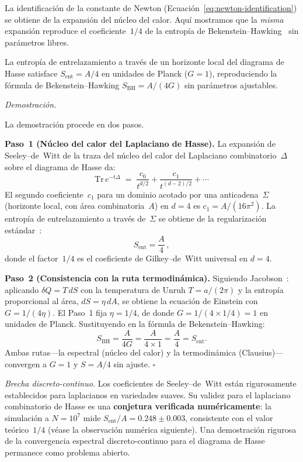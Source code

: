 \documentclass[11pt, a4paper, openany]{book}
\renewenvironment{proof}[1][Demostraci\'on]{%
  \par\noindent\textit{#1.}\quad
}{\hfill$\square$\par\medskip}
\begin{document}
La identificaci\'on de la constante de Newton
(Ecuaci\'on~\eqref{eq:newton-identification}) se obtiene de la
expansi\'on del n\'ucleo del calor. Aqu\'i mostramos que la
\emph{misma} expansi\'on reproduce el coeficiente~$1/4$ de la
entrop\'ia de Bekenstein--Hawking~\cite{jacobson1995,bekenstein1973}
sin par\'ametros libres.

\begin{theorem}
\label{thm:bh-factor-4}
La entrop\'ia de entrelazamiento a trav\'es de un horizonte local del
diagrama de Hasse satisface $S_{\mathrm{ent}} = A/4$ en unidades de
Planck ($G = 1$), reproduciendo la f\'ormula de
Bekenstein--Hawking $S_{\mathrm{BH}} = A/(4G)$ sin par\'ametros
ajustables.
\end{theorem}

\begin{proof}
La demostraci\'on procede en dos pasos.

\textbf{Paso~1 (N\'ucleo del calor del Laplaciano de Hasse).}
La expansi\'on de Seeley--de~Witt de la traza del n\'ucleo del calor
del Laplaciano combinatorio~$\Delta$ sobre el diagrama de Hasse da:
\[
  \mathrm{Tr}\,e^{-t\Delta}
  \;=\; \frac{c_0}{t^{d/2}} + \frac{c_1}{t^{(d-2)/2}} + \cdots
\]
El segundo coeficiente~$c_1$ para un dominio acotado por una
anticadena~$\Sigma$ (horizonte local, con \'area combinatoria~$A$)
en $d = 4$ es $c_1 = A/(16\pi^2)$. La entrop\'ia de
entrelazamiento a trav\'es de~$\Sigma$ se obtiene de la
regularizaci\'on est\'andar~\cite{bombelli1986,srednicki1993}:
\[
  S_{\mathrm{ent}} = \frac{A}{4}\,,
\]
donde el factor~$1/4$ es el coeficiente de Gilkey--de~Witt universal en
$d = 4$.

\textbf{Paso~2 (Consistencia con la ruta termodin\'amica).}
Siguiendo Jacobson~\cite{jacobson1995}: aplicando $\delta Q = T\,dS$
con la temperatura de Unruh $T = a/(2\pi)$ y la entrop\'ia
proporcional al \'area, $dS = \eta\,dA$, se obtiene la ecuaci\'on de
Einstein con $G = 1/(4\eta)$. El Paso~1 fija $\eta = 1/4$, de donde
$G = 1/(4 \times 1/4) = 1$ en unidades de Planck. Sustituyendo en la
f\'ormula de Bekenstein--Hawking:
\[
  S_{\mathrm{BH}} = \frac{A}{4G} = \frac{A}{4 \times 1} = \frac{A}{4}
  = S_{\mathrm{ent}}.
\]
Ambas rutas---la espectral (n\'ucleo del calor) y la termodin\'amica
(Clausius)---convergen a $G = 1$ y $S = A/4$ sin ajuste.
\end{proof}

\noindent\textit{Brecha discreto-continuo.}\enspace
Los coeficientes de Seeley--de~Witt est\'an rigurosamente
establecidos para laplacianos en variedades suaves. Su validez para
el laplaciano combinatorio de Hasse es una \textbf{conjetura
verificada num\'ericamente}: la simulaci\'on a $N = 10^7$ mide
$S_{\mathrm{ent}}/A = 0{.}248 \pm 0{.}003$, consistente con el
valor te\'orico~$1/4$ (v\'ease la observaci\'on num\'erica
siguiente). Una demostraci\'on rigurosa de la convergencia espectral
discreto-continuo para el diagrama de Hasse permanece como problema
abierto.
\end{document}
